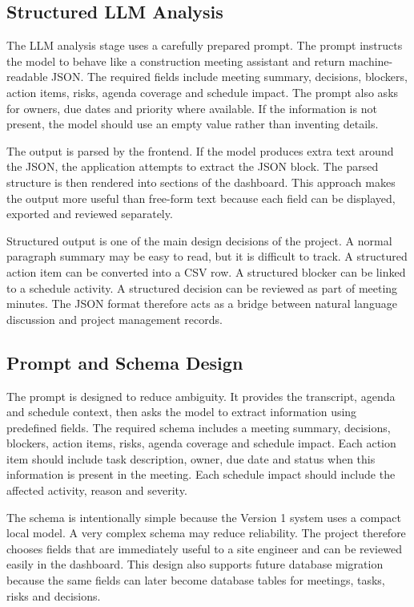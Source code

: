 \documentclass[11pt,a4paper]{article}
\begin{document}
\subsection{Structured LLM Analysis}

The LLM analysis stage uses a carefully prepared prompt. The prompt instructs the model to behave like a construction meeting assistant and return machine-readable JSON. The required fields include meeting summary, decisions, blockers, action items, risks, agenda coverage and schedule impact. The prompt also asks for owners, due dates and priority where available. If the information is not present, the model should use an empty value rather than inventing details.

The output is parsed by the frontend. If the model produces extra text around the JSON, the application attempts to extract the JSON block. The parsed structure is then rendered into sections of the dashboard. This approach makes the output more useful than free-form text because each field can be displayed, exported and reviewed separately.

Structured output is one of the main design decisions of the project. A normal paragraph summary may be easy to read, but it is difficult to track. A structured action item can be converted into a CSV row. A structured blocker can be linked to a schedule activity. A structured decision can be reviewed as part of meeting minutes. The JSON format therefore acts as a bridge between natural language discussion and project management records.

\subsection{Prompt and Schema Design}

The prompt is designed to reduce ambiguity. It provides the transcript, agenda and schedule context, then asks the model to extract information using predefined fields. The required schema includes a meeting summary, decisions, blockers, action items, risks, agenda coverage and schedule impact. Each action item should include task description, owner, due date and status when this information is present in the meeting. Each schedule impact should include the affected activity, reason and severity.

The schema is intentionally simple because the Version 1 system uses a compact local model. A very complex schema may reduce reliability. The project therefore chooses fields that are immediately useful to a site engineer and can be reviewed easily in the dashboard. This design also supports future database migration because the same fields can later become database tables for meetings, tasks, risks and decisions.
\end{document}

